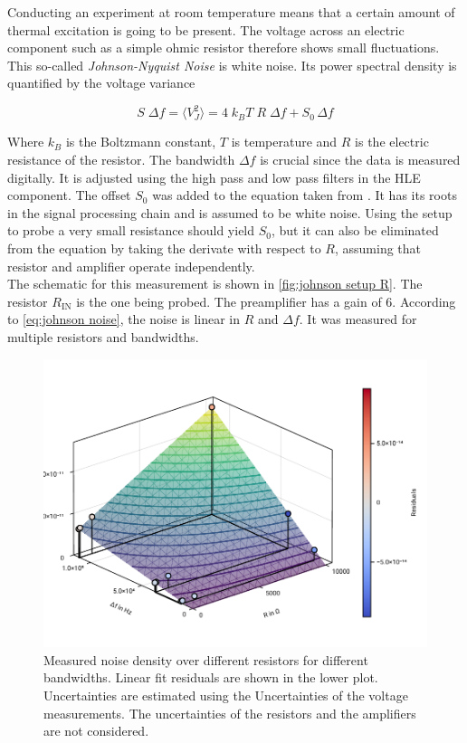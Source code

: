 \documentclass[
    parskip=half, 
    twoside=false,
    twocolumn=true,
    fontsize=11pt,
]{scrarticle}
\begin{document}
Conducting an experiment at room temperature means that a certain amount of thermal excitation is going to be present. The voltage across an electric component such as a simple ohmic resistor therefore shows small fluctuations. This so-called \textit{Johnson-Nyquist Noise} is white noise. Its power spectral density is quantified by the voltage variance

\begin{equation}
    \label{eq:johnson noise}
    S\;\Delta f = \langle V_J^2 \rangle = 4\; k_B T\; R\; \Delta f + S_0\, \Delta f
\end{equation} 

Where $k_B$ is the Boltzmann constant, $T$ is temperature and $R$ is the electric resistance of the resistor. The bandwidth $\Delta f$ is crucial since the data is measured digitally. It is adjusted using the high pass and low pass filters in the HLE component. The offset $S_0$ was added to the equation taken from \autocite{Buch}. It has its roots in the signal processing chain and is assumed to be white noise. 
Using the setup to probe a very small resistance should yield $S_0$, but it can also be eliminated from the equation by taking the derivate with respect to $R$, assuming that resistor and amplifier operate independently.\\
The schematic for this measurement is shown in \autoref{fig:johnson setup R}. The resistor $R_\text{IN}$ is the one being probed. The preamplifier has a gain of $6$.  According to \autoref{eq:johnson noise}, the noise is linear in $R$ and $\Delta f$. It was measured for multiple resistors and bandwidths. \\
\begin{figure}[h!]
    \centering
    \includegraphics{figures/05 johnson noise rt plane.pdf}
    \caption{
        Measured noise density over different resistors for different bandwidths.
        Linear fit residuals are shown in the lower plot.
        Uncertainties are estimated using the Uncertainties of the voltage measurements.
        The uncertainties of the resistors and the amplifiers are not considered.
    }
    \label{fig:johnson noise}
\end{figure}
\end{document}
